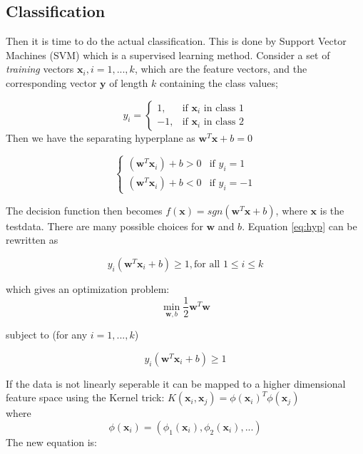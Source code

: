 \documentclass{article}
\begin{document}
\subsection{Classification}
Then it is time to do the actual classification. This is done by Support Vector Machines (SVM) which is a supervised learning method. 
Consider a set of \textit{training} vectors $ \textbf{x}_{i}, i = 1,...,k $, which are the feature vectors, and the corresponding vector $ \textbf{y} $ of length $ k $ containing the class values; 

\begin{equation}
y_{i} =
\begin{cases}
1, & \text{if $\textbf{x}_{i}$ in class 1} \\
-1,
& \text{if $\textbf{x}_{i}$ in class 2}
\end{cases}
\end{equation}
Then we have the separating hyperplane as $\textbf{w}^{T}\textbf{x} + b = 0$

\begin{equation}
\label{eq:hyp}
\begin{cases}
(\textbf{w}^{T}\textbf{x}_{i}) + b > 0 & \text{if $y_{i} = 1$} \\
(\textbf{w}^{T}\textbf{x}_{i}) + b < 0 & \text{if $y_{i} = -1$}
\end{cases}
\end{equation}

The decision function then becomes $f(\textbf{x}) = sgn(\textbf{w}^{T}\textbf{x} + b)$, where $ \textbf{x} $ is the testdata. There are many possible choices for $\textbf{w}$ and $b$.
Equation \ref{eq:hyp} can be rewritten as 

\begin{equation}
y_{i}(\textbf{w}^{T}\textbf{x}_{i} + b) \geq 1, \text{for all $1 \leq i \leq k$}
\end{equation}

which gives an optimization problem: \\

\begin{equation}
\min_{\textbf{w},b} \dfrac{1}{2}\textbf{w}^{T}\textbf{w}
\end{equation}

subject to (for any $ i = 1,...,k $)

\begin{equation*}
y_{i}(\textbf{w}^{T}\textbf{x}_{i} + b) \geq 1
\end{equation*}

If the data is not linearly seperable it can be mapped to a higher dimensional feature space using the Kernel trick: $ K(\textbf{x}_{i},\textbf{x}_{j}) = \phi(\textbf{x}_{i})^{T}\phi(\textbf{x}_{j}) $ \\
where
\begin{equation*}
\phi(\textbf{x}_{i}) = (\phi_{1}(\textbf{x}_{i}), \phi_{2}(\textbf{x}_{i}),...)
\end{equation*}
The new equation is:
\end{document}
